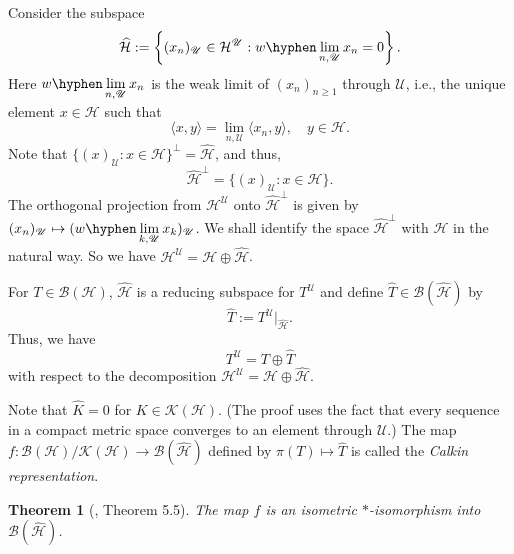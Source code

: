 \documentclass[11pt]{amsart}
\newtheorem{theorem}{Theorem}[section]
\theoremstyle{definition}
\numberwithin{equation}{section}
\begin{document}
Consider the subspace
\[\widehat{\mathcal{H}}:=\left\{(x_{n})_{\mathscr{U}}\in \mathcal{H}^{\mathscr{U}}:w\hyphen\lim_{n,\mathscr{U}}x_{n}=0\right\}.\]
Here $\displaystyle w\hyphen\lim_{n,\mathscr{U}}x_{n}$ is the weak limit of $(x_{n})_{n\geq 1}$ through $\mathscr{U}$, i.e., the unique element $x\in\mathcal{H}$ such that
\[\langle x,y\rangle=\lim_{n,\mathscr{U}}\langle x_{n},y\rangle,\quad y\in\mathcal{H}.\]
Note that $\{(x)_{\mathscr{U}}:x\in\mathcal{H}\}^{\perp}=\widehat{\mathcal{H}}$, and thus,
\[\widehat{\mathcal{H}}^{\perp}=\{(x)_{\mathscr{U}}:x\in\mathcal{H}\}.\]
The orthogonal projection from $\mathcal{H}^{\mathscr{U}}$ onto $\widehat{\mathcal{H}}^{\perp}$ is given by $\displaystyle (x_{n})_{\mathscr{U}}\mapsto(w\hyphen\lim_{k,
\mathscr{U}}x_{k})_{\mathscr{U}}$. We shall identify the space $\widehat{\mathcal{H}}^{\perp}$ with $\mathcal{H}$ in the natural way. So we have $\mathcal{H}^{\mathscr{U}}=\mathcal{H}\oplus\mathcal{\widehat{H}}$.

For $T\in\mathcal{B(H)}$, $\mathcal{\widehat{H}}$ is a reducing subspace for $T^{\mathscr{U}}$ and define $\widehat{T}\in\mathcal{B}(\mathcal{\widehat{H}})$ by
\[\widehat{T}:=T^{\mathscr{U}}|_{\mathcal{\widehat{H}}}.\]
Thus, we have
\[T^{\mathscr{U}}=T\oplus\widehat{T}\]
with respect to the decomposition $\mathcal{H}^{\mathscr{U}}=\mathcal{H}\oplus\widehat{\mathcal{H}}$.

Note that $\widehat{K}=0$ for $K\in\mathcal{K(H)}$. (The proof uses the fact that every sequence in a compact metric space converges to an element through $\mathscr{U}$.) The map $f:\mathcal{B(H)}/\mathcal{K(H)}\to\mathcal{B}(\widehat{\mathcal{H}})$ defined by $\pi(T)\mapsto\widehat{T}$
is called the {\it Calkin representation}.
\begin{theorem}[\cite{Calkin}, Theorem 5.5]\label{31}
The map $f$ is an isometric $*$-isomorphism into $\mathcal{B}(\mathcal{\widehat{H}})$.
\end{theorem}
\end{document}

